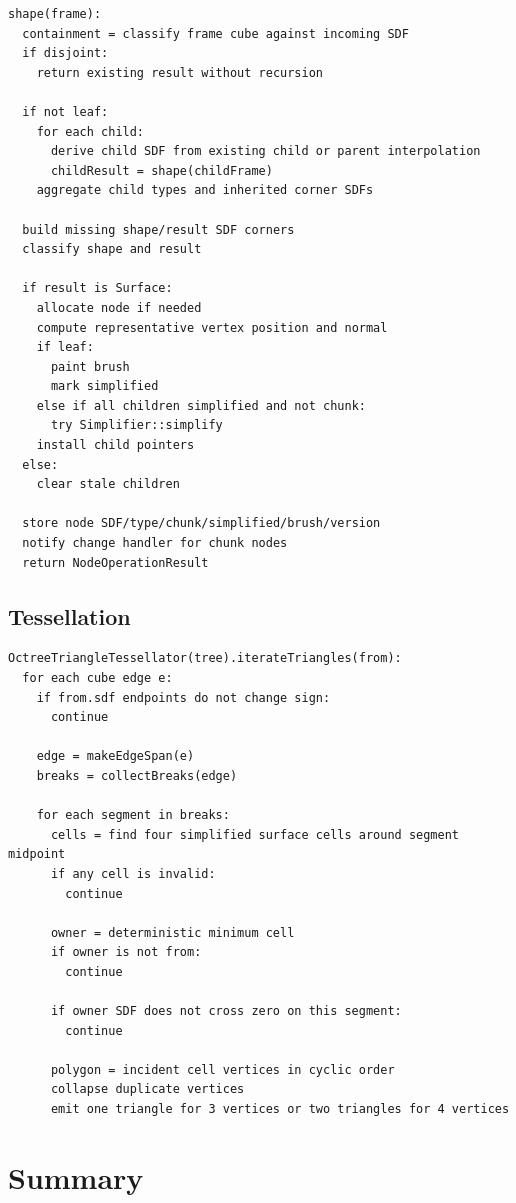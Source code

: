 \documentclass[11pt,a4paper]{article}
\begin{document}
\begin{lstlisting}
shape(frame):
  containment = classify frame cube against incoming SDF
  if disjoint:
    return existing result without recursion

  if not leaf:
    for each child:
      derive child SDF from existing child or parent interpolation
      childResult = shape(childFrame)
    aggregate child types and inherited corner SDFs

  build missing shape/result SDF corners
  classify shape and result

  if result is Surface:
    allocate node if needed
    compute representative vertex position and normal
    if leaf:
      paint brush
      mark simplified
    else if all children simplified and not chunk:
      try Simplifier::simplify
    install child pointers
  else:
    clear stale children

  store node SDF/type/chunk/simplified/brush/version
  notify change handler for chunk nodes
  return NodeOperationResult
\end{lstlisting}

\subsection{Tessellation}

\begin{lstlisting}
OctreeTriangleTessellator(tree).iterateTriangles(from):
  for each cube edge e:
    if from.sdf endpoints do not change sign:
      continue

    edge = makeEdgeSpan(e)
    breaks = collectBreaks(edge)

    for each segment in breaks:
      cells = find four simplified surface cells around segment midpoint
      if any cell is invalid:
        continue

      owner = deterministic minimum cell
      if owner is not from:
        continue

      if owner SDF does not cross zero on this segment:
        continue

      polygon = incident cell vertices in cyclic order
      collapse duplicate vertices
      emit one triangle for 3 vertices or two triangles for 4 vertices
\end{lstlisting}

\section{Summary}
\end{document}
